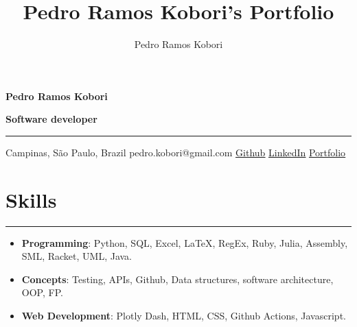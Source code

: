 \documentclass[a4paper,10pt]{article}
\title{Pedro Ramos Kobori's Portfolio}
\newcommand{\ulink}[2]{\href{#1}{\underline{#2}}}
\begin{document}
\date{}
\author{Pedro Ramos Kobori}

\noindent
\begin{minipage}[t]{0.5\textwidth}
  \begin{flushleft}
    \textbf{\Large Pedro Ramos Kobori}
  \end{flushleft}
\end{minipage}
\begin{minipage}[t]{0.5\textwidth}
  \begin{flushright}
    \textbf{\Large Software developer}
  \end{flushright}
\end{minipage}

\hrule

\vspace{2mm}
\noindent
{
  \centering
  Campinas, São Paulo, Brazil \textbar{}
  pedro.kobori@gmail.com \textbar{}
  \ulink{https://github.com/rokobo}{Github} \textbar{}
  \ulink{https://www.linkedin.com/in/pedrokobori/}{LinkedIn} \textbar{}
  \ulink{https://rokobo.github.io}{Portfolio}
  \par
}

\section*{Skills}
\hrule
\vspace{2mm}
\begin{itemize}[itemsep=0pt]
  \item \textbf{Programming}: Python, SQL, Excel, LaTeX, RegEx, Ruby, Julia, Assembly, SML, Racket, UML, Java.
  \item \textbf{Concepts}: Testing, APIs, Github, Data structures, software architecture, OOP, FP.
  \item \textbf{Web Development}: Plotly Dash, HTML, CSS, Github Actions, Javascript.
\end{itemize}
\end{document}
